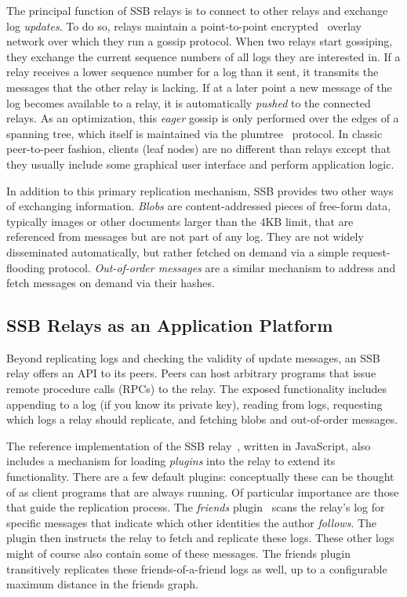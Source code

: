 \documentclass[9pt,sigconf]{acmart}
\begin{document}
The principal function of SSB relays is to connect to other relays and exchange log {\em updates}. To do so, relays maintain a point-to-point encrypted~\cite{tarr2015secrethandshake} overlay network over which they run a gossip protocol. When two relays start gossiping, they exchange the current sequence numbers of all logs they are interested in. If a relay receives a lower sequence number for a log than it sent, it transmits the messages that the other relay is lacking. If at a later point a new message of the log becomes available to a relay, it is automatically \textit{pushed} to the connected relays. As an optimization, this {\em eager} gossip is only performed over the edges of a spanning tree, which itself is maintained via the plumtree~\cite{leitao2007epidemic} protocol. In classic peer-to-peer fashion, clients (leaf nodes) are no different than relays except that they usually include some graphical user interface and perform application logic.

In addition to this primary replication mechanism, SSB provides two other ways of exchanging information. {\em Blobs} are content-addressed pieces of free-form data, typically images or other documents larger than the 4KB limit, that are referenced from messages but are not part of any log. They are not widely disseminated automatically, but rather fetched on demand via a simple request-flooding protocol. {\em Out-of-order messages} are a similar mechanism to address and fetch messages on demand via their hashes.

\subsection*{SSB Relays as an Application Platform}

Beyond replicating logs and checking the validity of update messages, an SSB relay offers an API to its peers. Peers can host arbitrary programs that issue remote procedure calls (RPCs) to the relay. The exposed functionality includes appending to a log (if you know its private key), reading from logs, requesting which logs a relay should replicate, and fetching blobs and out-of-order messages.

The reference implementation of the SSB relay~\cite{ssb-server}, written in JavaScript, also includes a mechanism for loading {\em plugins} into the relay to extend its functionality. There are a few default plugins: conceptually these can be thought of as client programs that are always running. Of particular importance are those that guide the replication process. The {\em friends} plugin~\cite{ssb-friends} scans the relay's log for specific messages that indicate which other identities the author {\em follows}. The plugin then instructs the relay to fetch and replicate these logs. These other logs might of course also contain some of these messages. The friends plugin transitively replicates these friends-of-a-friend logs as well, up to a configurable maximum distance in the friends graph.
\end{document}
